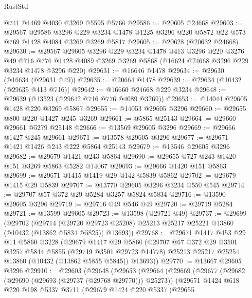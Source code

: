 \begin{lexlean}{RustStd}
\begin{coremodule}
    @741
    @1469
    @4030
    @3269
    @5595
    @5766
@29586 := @20605 @24668
@29603 := @29567
    @29586
    @3296
    @229
    @3234
    @1478
    @1225
    @3296
    @220
    @5872
    @22
    @573
    @769
    @1428
    @4084
    @3269
    @3269
    @5817
@29605 := @20628 (@20632 @24668)
@29630 := @29567
    @29605
    @3296
    @229
    @3234
    @1478
    @413
    @3296
    @220
    @3276
    @49
    @716
    @776
    @1428
    @4089
    @3269
    @3269
    @5868
    (@16624 @24668 @3296 @229 @3234 @1478 @3296 @220)
@29631 := @16646 @1478
@29634 := @29630 (@16634 (@29631 @49))
@29635 := @20664 @1478
@29639 := @29634 (@10432 (@29635 @413 @716))
@29642 := @16660 @24668 @229 @3234
@29648 := @29639 (@13523 (@29642 @716 @776 @4089 @3269))
@29653 := @14044 @29605 @1428 @220 @3269 @5867
@29655 := @14053 @29605 @3296
@29660 := @29655 @800 @220 @1427 @245 @3269
@29661 := @5865 @25143
@29664 := @29660 @29661 @5279 @25148
@29666 := @13569 @29605 @3296
@29669 := @29666 @1427 @245 @29661
@29671 := @13578 @29605 @3296
@29677 := @29671 @1421 @1426 @243 @222 @5864 @25143
@29679 := @13546 @29605 @3296
@29682 := @29679 @1421 @243 @5864
@29690 := @29655 @727 @243 @1420 @151 @3269 @5863 @5282 @14067
@29693 := @29666 @1420 @151 @5863
@29699 := @29671 @1415 @1419 @29 @142 @5839 @5862
@29702 := @29679 @1415 @29 @5839
@29707 := @13770 @29605 @3296 @3234 @550 @545
@29714 := @29707 @57 @372 @29 @5284 @3257 @5824 @5834
@29716 := @13590 @29605 @3296
@29719 := @29716 @49 @546 @49
@29720 := @29719 @5284
@29721 := @13599 @29605
@29723 := @13598 (@29721 @49)
@29737 := @29699
    (@29702
      (@29714
        (@29720 @29723 @25208)
        @25213
        @25217
        @25221
        @13860
        (@10432 (@13862 @5834 @5825))
        @13693))
@29768 := @29671
    @1417
    @453
    @29
    @11
    @5860
    @3228
    (@29679
      @1417
      @29
      @5860
      (@29707
        @67
        @372
        @29
        @3501
        @3257
        @5844
        @5855
        (@29719 @3501 @29723 @14778)
        @25213
        @25217
        @25254
        @13860
        (@10432 (@13862 @5855 @5845))
        @13693))
@29770 := @13667 @29605 @3296
@29910 := @29603
    (@29648
      (@29653
        (@29664
          (@29669
            (@29677
              (@29682 (@29690 (@29693 (@29737 (@29768 @29770))) @25273))
              (@29671
                @1424
                @618
                @220
                @198
                @5337
                @3711
                (@29679
                  @1424
                  @220
                  @5337
                  (@29655

\end{coremodule}
\end{lexlean}
